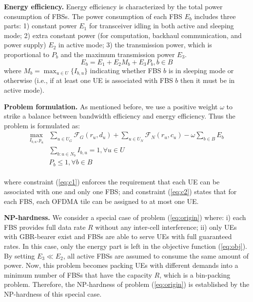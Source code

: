 \documentclass[conference]{IEEEtran}
\begin{document}
\noindent\textbf{Energy efficiency.} Energy efficiency is characterized by the total power consumption of FBSs. The power consumption of each FBS $E_b$ includes three parts: 1) constant power $E_1$ for transceiver idling in both active and sleeping mode; 2) extra constant power (for computation, backhaul communication, and power supply) $E_2$ in active mode; 3) the transmission power, which is proportional to $P_b$ and the maximum transmission power $E_3$. 
\begin{equation}
 E_b = E_1+ E_2 M_b + E_3 P_b, b\in B
 \end{equation}
where $M_b =  \max_{u\in U}\{I_{b,u}\}$ indicating whether FBS $b$ is in sleeping mode or otherwise (i.e., if at least one UE is associated with FBS $b$ then it must be in active mode).

\noindent\textbf{Problem formulation.} As mentioned before, we use a positive weight $\omega$ to strike a balance between bandwidth efficiency and energy efficiency. Thus the problem is formulated as:
\begin{subequations}
\begin{align}
\max\limits_{I_{b,u}, p_u} & \sum\limits_{u \in U_G} \mathcal{F}_G (r_u,d_u) + \!\sum\limits_{u \in U_N} \mathcal{F}_N (r_u,c_u) - \omega \sum\limits_{b \in B}E_b \label{eq:obj}\\
&  \sum\limits_{b: u\in N_b}I_{b,u} = 1, \forall u\in U \label{eq:c1}\\
& P_b \leq 1, \forall b\in B \label{eq:c2}
\end{align}
\label{eq:origin}
\end{subequations}\\
where constraint (\ref{eq:c1}) enforces the requirement that each UE can be associated with one and only one FBS; and constraint (\ref{eq:c2}) states that for each FBS, each OFDMA tile can be assigned to at most one UE.



\noindent\textbf{NP-hardness.} We consider a special case of problem (\ref{eq:origin}) where: i) each FBS provides full data rate $R$ without any inter-cell interference; ii) only UEs with GBR-bearer exist and FBSs are able to serve UEs with full guaranteed rates. In this case, only the energy part is left in the objective function (\ref{eq:obj}). By setting $E_3 \ll E_2$, all active FBSs are assumed to consume the same amount of power. Now, this problem becomes packing UEs with different demands into a minimum number of FBSs that have the capacity $R$, which is a bin-packing problem. Therefore, the NP-hardness of problem (\ref{eq:origin}) is established by the NP-hardness of this special case.
\end{document}
